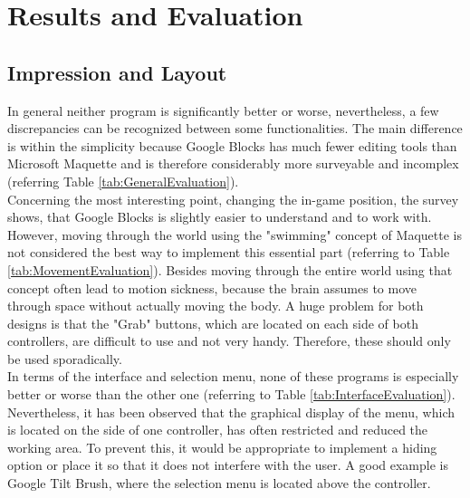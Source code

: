 \documentclass{report}
\begin{document}
	\section{Results and Evaluation}
	\startsection
		\vspace{0.1cm}
		\subsection{Impression and Layout}
		\startsubsection
			In general neither program is significantly better or worse, nevertheless, a few discrepancies can be recognized between some functionalities. The main difference is within the simplicity because Google Blocks has much fewer editing tools than Microsoft Maquette and is therefore considerably more surveyable and incomplex (referring Table \ref{tab:GeneralEvaluation}). \\
			Concerning the most interesting point, changing the in-game position, the survey shows, that Google Blocks is slightly easier to understand and to work with. However, moving through the world using the "swimming" concept of Maquette is not considered the best way to implement this essential part (referring to Table \ref{tab:MovementEvaluation}). Besides moving through the entire world using that concept often lead to motion sickness, because the brain assumes to move through space without actually moving the body. A huge problem for both designs is that the "Grab" buttons, which are located on each side of both controllers, are difficult to use and not very handy. Therefore, these should only be used sporadically. \\
			In terms of the interface and selection menu, none of these programs is especially better or worse than the other one (referring to Table \ref{tab:InterfaceEvaluation}). Nevertheless, it has been observed that the graphical display of the menu, which is located on the side of one controller, has often restricted and reduced the working area. To prevent this, it would be appropriate to implement a hiding option or place it so that it does not interfere with the user. A good example is Google Tilt Brush, where the selection menu is located above the controller.
		\closesection
\end{document}
